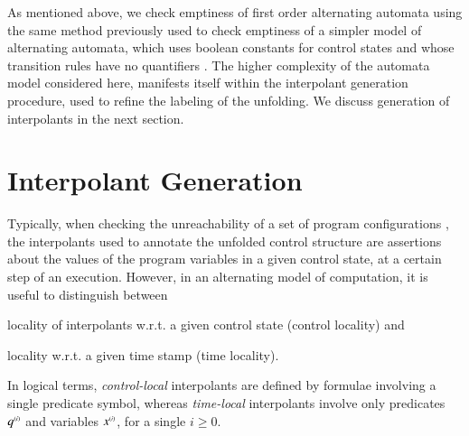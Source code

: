 As mentioned above, we check emptiness of first order alternating
automata using the same method previously used to check emptiness of a
simpler model of alternating automata, which uses boolean constants
for control states and whose transition rules have no quantifiers
\cite{IosifXu18}. The higher complexity of the automata model
considered here, manifests itself within the interpolant generation
procedure, used to refine the labeling of the unfolding. We discuss
generation of interpolants in the next section.

\section{Interpolant Generation}\label{sec:interpolants}

Typically, when checking the unreachability of a set of program
configurations \cite{McMillan06}, the interpolants used to annotate
the unfolded control structure are assertions about the values of the
program variables in a given control state, at a certain step of an
execution. However, in an alternating model of computation, it is
useful to distinguish between
\begin{inparaenum}[(i)]
\item locality of interpolants w.r.t. a given control state (control
  locality) and
%
\item locality w.r.t. a given time stamp (time locality).
\end{inparaenum} 
In logical terms, \emph{control-local} interpolants are defined by
formulae involving a single predicate symbol, whereas
\emph{time-local} interpolants involve only predicates ${q}^{\scriptscriptstyle{({i})}}$
and variables ${x}^{\scriptscriptstyle{({i})}}$, for a single $i \geq 0$.

